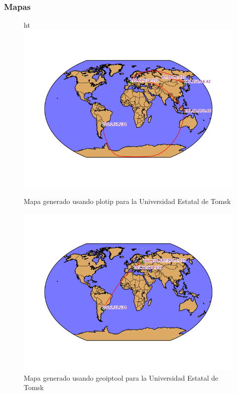 \subsubsection{Mapas}




\begin{figure}{ht}
	\centering
	\includegraphics[scale=0.8]{imagenes/mapa_tsu_plotip.png}
	\caption{Mapa generado usando plotip para la Universidad Estatal de Tomsk}
\end{figure} 

\begin{figure}[ht]
	\centering
	\includegraphics[scale=0.8]{imagenes/mapa_tsu_geoip.png}
	\caption{Mapa generado usando geoiptool para la Universidad Estatal de Tomsk}
\end{figure} 
